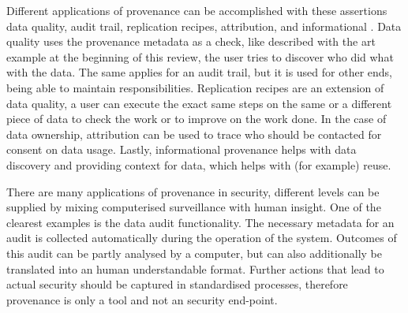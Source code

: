 Different applications of provenance can be accomplished with these assertions \eg{} data quality, audit trail, replication recipes, attribution, and informational \cite{dsp1simmhan}.
Data quality uses the provenance metadata as a check, like described with the art example at the beginning of this review, the user tries to discover who did what with the data.
The same applies for an audit trail, but it is used for other ends, being able to maintain responsibilities.
Replication recipes are an extension of data quality, a user can execute the exact same steps on the same or a different piece of data to check the work or to improve on the work done.
In the case of data ownership, attribution can be used to trace who should be contacted for consent on data usage.
Lastly, informational provenance helps with data discovery and providing context for data, which helps with (for example) reuse.

There are many applications of provenance in security, different levels can be supplied by mixing computerised surveillance with human insight.
One of the clearest examples is the data audit functionality.
The necessary metadata for an audit is collected automatically during the operation of the system.
Outcomes of this audit can be partly analysed by a computer, but can also additionally be translated into an human understandable format.
Further actions that lead to actual security should be captured in standardised processes, therefore provenance is only a tool and not an security end-point.